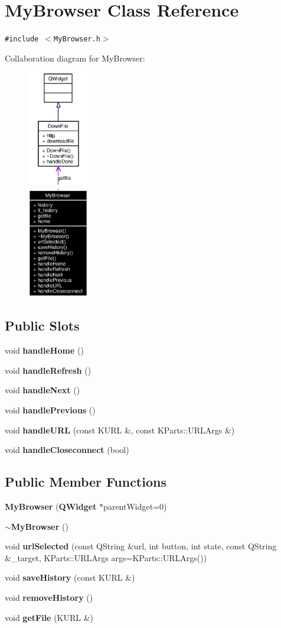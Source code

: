 \section{My\-Browser Class Reference}
\label{classMyBrowser}
{\tt \#include $<$My\-Browser.h$>$}

Collaboration diagram for My\-Browser:\begin{figure}[H]
\begin{center}
\leavevmode
\includegraphics[width=76pt]{classMyBrowser__coll__graph}
\end{center}
\end{figure}
\subsection*{Public Slots}
\begin{CompactItemize}
\item 
void {\bf handle\-Home} ()
\item 
void {\bf handle\-Refresh} ()
\item 
void {\bf handle\-Next} ()
\item 
void {\bf handle\-Previous} ()
\item 
void {\bf handle\-URL} (const KURL \&, const KParts::URLArgs \&)
\item 
void {\bf handle\-Closeconnect} (bool)
\end{CompactItemize}
\subsection*{Public Member Functions}
\begin{CompactItemize}
\item 
{\bf My\-Browser} ({\bf QWidget} $\ast$parent\-Widget=0)
\item 
{\bf $\sim$My\-Browser} ()
\item 
void {\bf url\-Selected} (const QString \&url, int button, int state, const QString \&\_\-target, KParts::URLArgs args=KParts::URLArgs())
\item 
void {\bf save\-History} (const KURL \&)
\item 
void {\bf remove\-History} ()
\item 
void {\bf get\-File} (KURL \&)
\end{CompactItemize}
